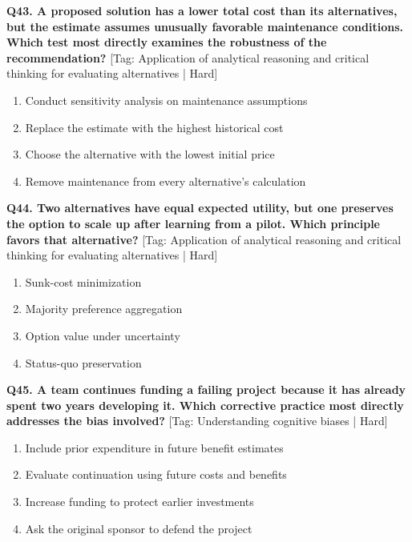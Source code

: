 \noindent\textbf{Q43. A proposed solution has a lower total cost than its alternatives, but the estimate assumes unusually favorable maintenance conditions. Which test most directly examines the robustness of the recommendation?} \hfill [Tag: Application of analytical reasoning and critical thinking for evaluating alternatives | Hard]
\begin{enumerate}[label=(\alph*),topsep=2pt,itemsep=1pt,partopsep=0pt,parsep=0pt]
    \item {Conduct sensitivity analysis on maintenance assumptions}
    \item {Replace the estimate with the highest historical cost}
    \item {Choose the alternative with the lowest initial price}
    \item {Remove maintenance from every alternative's calculation}
\end{enumerate}
\vspace{2mm}

\noindent\textbf{Q44. Two alternatives have equal expected utility, but one preserves the option to scale up after learning from a pilot. Which principle favors that alternative?} \hfill [Tag: Application of analytical reasoning and critical thinking for evaluating alternatives | Hard]
\begin{enumerate}[label=(\alph*),topsep=2pt,itemsep=1pt,partopsep=0pt,parsep=0pt]
    \item {Sunk-cost minimization}
    \item {Majority preference aggregation}
    \item {Option value under uncertainty}
    \item {Status-quo preservation}
\end{enumerate}
\vspace{2mm}

\noindent\textbf{Q45. A team continues funding a failing project because it has already spent two years developing it. Which corrective practice most directly addresses the bias involved?} \hfill [Tag: Understanding cognitive biases | Hard]
\begin{enumerate}[label=(\alph*),topsep=2pt,itemsep=1pt,partopsep=0pt,parsep=0pt]
    \item {Include prior expenditure in future benefit estimates}
    \item {Evaluate continuation using future costs and benefits}
    \item {Increase funding to protect earlier investments}
    \item {Ask the original sponsor to defend the project}
\end{enumerate}
\vspace{2mm}

